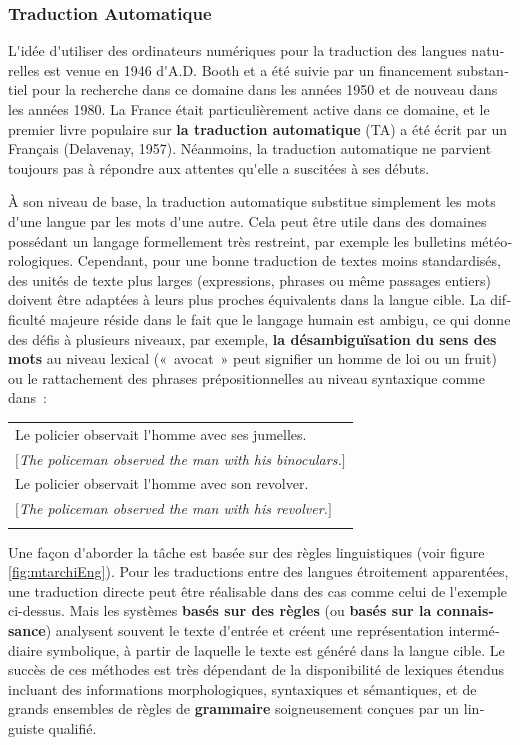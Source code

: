 \begin{french}
\begin{multicols}{2}
\subsubsection{Traduction Automatique}
L{\mbox '}idée d{\mbox '}utiliser des ordinateurs numériques pour la traduction des
langues naturelles est venue en 1946 d{\mbox '}A.D. Booth et a été suivie par
un financement substantiel pour la recherche dans ce domaine dans les
années 1950 et de nouveau dans les années 1980. La France était
particulièrement active dans ce domaine, et le premier livre populaire
sur {\bf la traduction automatique} (TA) a été écrit par un Français
(Delavenay, 1957). Néanmoins, la traduction automatique ne
parvient toujours pas à répondre aux attentes qu{\mbox '}elle a suscitées à
ses débuts.

À son niveau de base, la traduction automatique substitue simplement les mots d{\mbox '}une langue
par les mots d{\mbox '}une autre. Cela peut être utile dans des domaines
possédant un langage formellement très restreint, par exemple les
bulletins météorologiques. Cependant, pour une bonne traduction de
textes moins standardisés, des unités de texte plus larges
(expressions, phrases ou même passages entiers) doivent être adaptées à
leurs plus proches équivalents dans la langue cible. La difficulté
majeure réside dans le fait que le langage humain est ambigu, ce qui
donne des défis à plusieurs niveaux, par exemple, {\bf la
  désambiguïsation du sens des mots} au niveau lexical («~avocat~»
peut signifier un homme de loi ou un fruit) ou le rattachement des phrases prépositionnelles au niveau syntaxique comme dans~:

\begin{tabular}{l}
\\
Le policier observait l{\mbox '}homme avec ses jumelles.\\
$[${\it The policeman observed the man with his binoculars.}$]$\\
Le policier observait l{\mbox '}homme avec son revolver.\\
$[${\it The policeman observed the man with his revolver.}$]$\\
\\
\end{tabular}

Une façon d{\mbox '}aborder la tâche est basée sur des règles
linguistiques (voir figure \ref{fig:mtarchiEng}). Pour les traductions entre des langues étroitement
apparentées, une traduction directe peut être réalisable dans des cas
comme celui de l{\mbox '}exemple ci-dessus. Mais les systèmes {\bf basés sur  des
règles} (ou {\bf basés sur la connaissance}) analysent souvent le texte
d{\mbox '}entrée et créent une représentation intermédiaire symbolique, à
partir de laquelle le texte est généré dans la langue cible.  Le
succès de ces méthodes est très dépendant de la disponibilité de
lexiques étendus incluant des informations morphologiques, syntaxiques
et sémantiques, et de grands ensembles de règles de {\bf grammaire}
soigneusement conçues par un linguiste qualifié.


\end{multicols}
\end{french}
